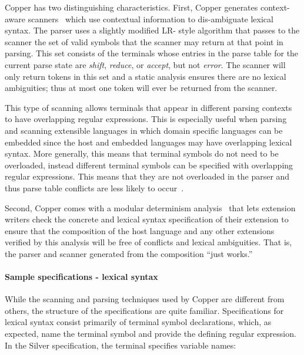 Copper has two distinguishing characteristics.  First, Copper generates
context-aware scanners~\cite{vanwyk07gpce} which use contextual
information to dis-ambiguate lexical syntax.
%
The parser uses a slightly modified LR- style algorithm that passes to
the scanner the set of valid symbols that the scanner may return at
that point in parsing. This set consists of the terminals whose
entries in the parse table for the current parse state are
\emph{shift}, \emph{reduce}, or \emph{accept}, but not \emph{error}.
The scanner will only return tokens in this set and a static analysis
ensures there are no lexical ambiguities; thus at most one token will
ever be returned from the scanner.

This type of scanning allows terminals that appear in different
parsing contexts to have overlapping regular expressions.  This is
especially useful when parsing and scanning extensible languages in
which domain specific languages can be embedded since the host and
embedded languages may have overlapping lexical syntax.  More
generally, this means that terminal symbols do not need to be
overloaded, instead different terminal symbols can be specified with
overlapping regular expressions.  This means that they are not
overloaded in the parser and thus parse table conflicts are less
likely to occur~\cite{vanwyk07gpce}.

Second, Copper comes with a modular determinism
analysis~\cite{schwerdfeger09pldi} that lets extension writers check
the concrete and lexical syntax specification of their extension to
ensure that the composition of the host language and any other
extensions verified by this analysis will be free of conflicts and
lexical ambiguities.  That is, the parser and scanner generated from
the composition ``just works.''


\paragraph{Sample specifications - lexical syntax}
While the scanning and parsing techniques used by Copper are different
from others, the structure of the specifications are quite familiar.
%
Specifications for lexical syntax consist primarily of terminal symbol
declarations, which, as expected, name the terminal symbol and provide
the defining regular expression.  In the Silver specification, the
 terminal specifies variable names:

